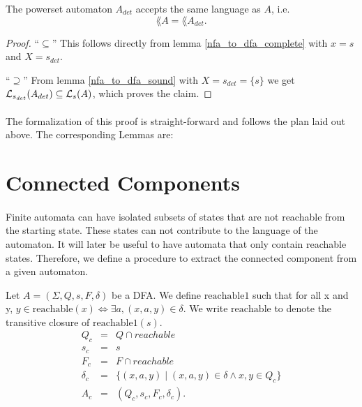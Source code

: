 \begin{theorem}
    The powerset automaton $A_{det}$ accepts the same language as $A$, i.e.
    \begin{equation*}        
        \lang{A} = \lang{A_{det}}.        
    \end{equation*}
\end{theorem}
\begin{proof}
    ``$\subseteq$'' 
    This follows directly from lemma \ref{nfa_to_dfa_complete} with $x = s$ and $X = {s}_{det}$.

    ``$\supseteq$''
    From lemma \ref{nfa_to_dfa_sound} with $X = {s}_{det} = \{s\}$ we get 
    $\mathcal{L}_{s_{det}}(A_{det}) \subseteq \mathcal{L}_{s}(A)$, which proves the claim.
\end{proof}

\paragraph{}
The formalization of this proof is straight-forward and follows the plan laid out above. 
The corresponding Lemmas are:


\section{Connected Components}
\paragraph{} 
Finite automata can have isolated subsets of states that are not reachable from the starting state. 
These states can not contribute to the language of the automaton. 
It will later be useful to have automata that only contain reachable states. 
Therefore, we define a procedure to extract the connected component from a given automaton.

\begin{definition}
    Let $A = (\Sigma, Q, s, F, \delta)$ be a DFA.
    We define $\mathrm{reachable1}$ such that for all x and y, 
    $y \in \mathrm{reachable}(x) \iff \exists a, (x,a,y) \in \delta$.
    We write $\mathrm{reachable}$ to denote the transitive closure of $\mathrm{reachable1}(s)$.
    \begin{eqnarray*}
        Q_c & = & Q \cap reachable \\
        s_c & = & s \\
        F_c & = & F \cap reachable \\
        \delta_c & = & \{(x, a, y) \; | \; (x, a, y) \in \delta \wedge x,y \in Q_c \} \\
        A_c &=& (Q_c, s_c, F_c, \delta_c).
    \end{eqnarray*}
\end{definition}

